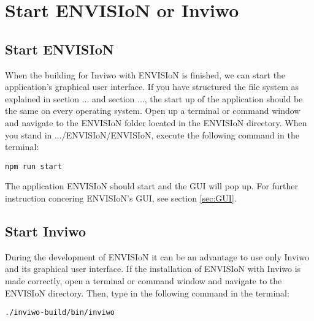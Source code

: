 \section{Start ENVISIoN or Inviwo}
\label{sec: start envision}
\subsection{Start ENVISIoN}
When the building for Inviwo with ENVISIoN is finished, we can start the application's graphical user interface. If you have structured the file system as explained in section ... and section ..., the start up of the application should be the same on every operating system. Open up a terminal or command window and navigate to the ENVISIoN folder located in the ENVISIoN directory. When you stand in .../ENVISIoN/ENVISIoN, execute the following command in the terminal:

\begin{lstlisting}[frame = single, breaklines = true]
    npm run start
\end{lstlisting}

The application ENVISIoN should start and the GUI will pop up. For further instruction concering ENVISIoN's GUI, see section \ref{sec:GUI}.

\subsection{Start Inviwo}
During the development of ENVISIoN it can be an advantage to use only Inviwo and its graphical user interface. If the installation of ENVISIoN with Inviwo is made correctly, open a terminal or command window and navigate to the ENVISIoN directory. Then, type in the following command in the terminal:

\begin{lstlisting}[frame = single, breaklines = true]
    ./inviwo-build/bin/inviwo
\end{lstlisting}